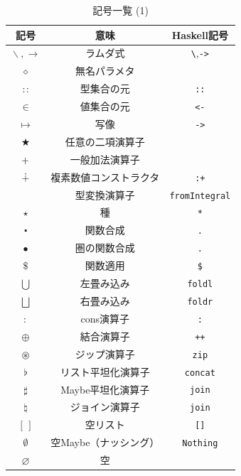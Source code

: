 \documentclass[a5paper,twoside,fleqn,draft]{jsbook}
\newcommand{\programminglanguage}[1]{\textsf{#1}}
\newcommand{\haskell}{\programminglanguage{Haskell}}
\newcommand{\code}[1]{\texttt{#1}}
\newcommand{\mEmptyList}{{[\,]}}
\newcommand{\mNothing}{\emptyset}
\newcommand{\mPureNothing}{\varnothing}
\newcommand{\mAnonParam}{\diamond}
\newcommand{\mUpCast}{\bigtriangleup}
\DeclareMathOperator{\mFromIntegral}{\mUpCast_\text{Integral}}
\DeclareMathOperator{\mAppend}{\oplus}
\DeclareMathOperator{\mApply}{\$}
\DeclareMathOperator{\mApplyRight}{\rightsquigarrow}
\DeclareMathOperator{\mBinOp}{\bigstar}
\DeclareMathOperator{\mComp}{\centerdot}
\DeclareMathOperator{\mCompCat}{\bullet}
\DeclareMathOperator{\mComplexPlus}{\dotplus}
\DeclareMathOperator*{\mFold}{\bigcup}
\DeclareMathOperator*{\mFoldRight}{\bigsqcup}
\DeclareMathOperator{\mIn}{{:\!:}}
\DeclareMathOperator{\mJoin}{\natural}
\DeclareMathOperator{\mJoinList}{\flat} %
\DeclareMathOperator{\mJoinMaybe}{\sharp}
\DeclareMathOperator{\mLambda}{\backslash}
\DeclareMathOperator{\mLambdaArrow}{\rightarrow}
\DeclareMathOperator{\mMapsTo}{\mapsto}
\DeclareMathOperator{\mPlus}{\boldmath{+}} %
\DeclareMathOperator{\mUnOp}{\star}
\DeclareMathOperator{\mZip}{\circledast}
\begin{document}
\begin{table}[p]
\caption{記号一覧 (1)}
\begin{center}
\begin{tabular}{||c|c|c||}
\hline
記号&意味&\haskell 記号\\
\hline\hline
$\mLambda, \mLambdaArrow$&ラムダ式&\code{\textbackslash},\code{->}\\
$\mAnonParam$&無名パラメタ&\\
\hline
$\mIn$&型集合の元&\code{::}\\
$\in$&値集合の元&\code{<-}\\
$\mMapsTo$&写像&\code{->}\\
\hline
$\mBinOp$&任意の二項演算子&\\
$\mPlus$&一般加法演算子&\\
\hline
$\mComplexPlus$&複素数値コンストラクタ&\code{:+}\\
\hline
$\mFromIntegral$&型変換演算子&\code{fromIntegral}\\
$\star$&種&\code{*}\\
\hline
$\mComp$&関数合成&\code{.}\\
$\mCompCat$&圏の関数合成&\code{.}\\
$\mApply$&関数適用&\code{\$}\\
\hline
$\mFold$&左畳み込み&\code{foldl}\\
$\mFoldRight$&右畳み込み&\code{foldr}\\
\hline
$:$&cons演算子&\code{:}\\
$\mAppend$&結合演算子&\code{++}\\
$\mZip$&ジップ演算子&\code{zip}\\
\hline
$\mJoinList$&リスト平坦化演算子&\code{concat}\\
$\mJoinMaybe$&Maybe平坦化演算子&\code{join}\\
$\mJoin$&ジョイン演算子&\code{join}\\
\hline
$\mEmptyList$&空リスト&\code{[]}\\
$\mNothing$&空Maybe（ナッシング）&\code{Nothing}\\
$\mPureNothing$&空&\\
\hline
\end{tabular}
\end{center}
\end{table}
\end{document}
